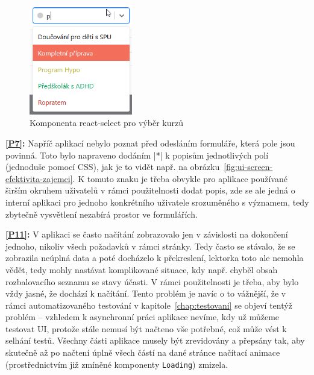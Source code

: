 \begin{figure}[h]\centering
    \includegraphics[width=0.4\textwidth]{img/ui-screen-select.png}
    \caption{Komponenta react-select pro výběr kurzů}\label{fig:ui-screen-select}
\end{figure}

\textbf{\ref{P7}:} Napříč aplikací nebylo poznat před odesláním formuláře, která pole jsou povinná. Toto bylo napraveno dodáním \cverb|*| k popisům jednotlivých polí (jednoduše pomocí CSS), jak je to vidět např. na obrázku~\ref{fig:ui-screen-efektivita-zajemci}. K tomuto znaku je třeba obvykle pro aplikace používané širším okruhem uživatelů v rámci použitelnosti dodat popis, zde se ale jedná o interní aplikaci pro jednoho konkrétního uživatele srozuměného s významem, tedy zbytečně vysvětlení nezabírá prostor ve formulářích.

\textbf{\ref{P11}:} V aplikaci se často načítání zobrazovalo jen v závislosti na dokončení jednoho, nikoliv všech požadavků v rámci stránky. Tedy často se stávalo, že se zobrazila neúplná data a poté docházelo k překreslení, lektorka toto ale nemohla vědět, tedy mohly nastávat komplikované situace, kdy např. chyběl obsah rozbalovacího seznamu se stavy účasti. V rámci použitelnosti je třeba, aby bylo vždy jasné, že dochází k načítání. Tento problém je navíc o to vážnější, že v rámci automatizovaného testování v kapitole~\ref{chap:testovani} se objeví tentýž problém -- vzhledem k asynchronní práci aplikace nevíme, kdy už můžeme testovat UI, protože stále nemusí být načteno vše potřebné, což může vést k selhání testů. Všechny části aplikace musely být zrevidovány a přepsány tak, aby skutečně až po načtení úplně všech částí na dané stránce načítací animace (prostřednictvím již zmíněné komponenty \verb|Loading|) zmizela.


